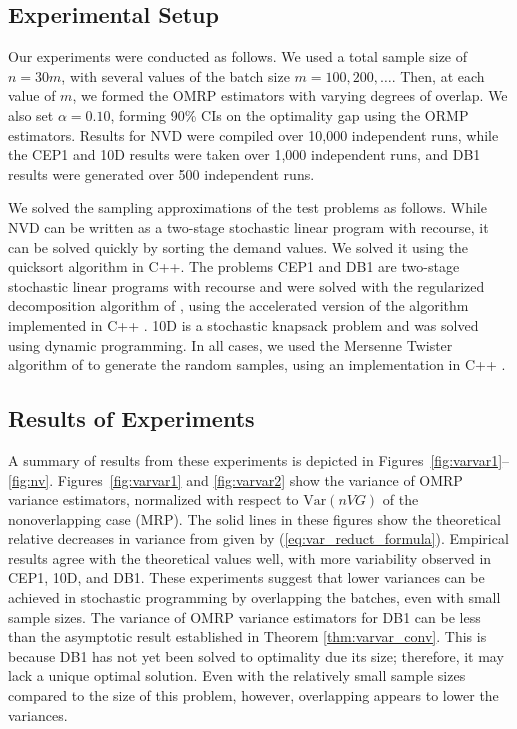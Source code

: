 \documentclass[12pt]{article}
\newcommand{\var}[1]{\mathrm{Var} \left( #1 \right)}
\begin{document}
\subsection{Experimental Setup}
\label{ssec:expS}


Our experiments were conducted as follows. 
We used a total sample size of $n = 30 m$, with several values of the batch size $m=100, 200, \ldots$. 
Then, at each value of $m$, we formed the OMRP estimators with varying degrees of overlap. 
We also set $\alpha=0.10$, forming 90\% CIs on the optimality gap using the ORMP estimators. 
Results for NVD were compiled over 10,000 independent runs, while the CEP1 and 10D results were taken over 1,000 independent runs, and DB1 results were generated over 500 independent runs.

We solved the sampling approximations of the test problems as follows.
While NVD can be written as a two-stage stochastic linear program with recourse, it can be solved quickly by sorting the demand values. 
We solved it using the quicksort algorithm in C++. 
The problems CEP1 and DB1 are two-stage stochastic linear programs with recourse and were solved with the regularized decomposition algorithm of \citet{ruszczynski1986regularized}, using the accelerated version of the algorithm implemented in C++ \citep{ruszczynski1997accelerating}. 
10D is a stochastic knapsack problem and was solved using dynamic programming.  
In all cases, we used the Mersenne Twister algorithm of \citet{matsumoto_nishimura_98} to generate the random samples, using an implementation in C++ \citep{wagner_twister_09}.




\subsection{Results of Experiments}
\label{ssec:results}

A summary of results from these experiments is depicted in Figures~\ref{fig:varvar1}--\ref{fig:nv}.
Figures~\ref{fig:varvar1} and \ref{fig:varvar2} show the variance of OMRP variance estimators, normalized with respect to $\var{nVG}$ of the nonoverlapping case (MRP). 
The solid lines in these figures show the theoretical relative decreases in variance from \citep{Welch1987} given by (\ref{eq:var_reduct_formula}). 
Empirical results agree with the theoretical values well, with more variability observed in CEP1, 10D, and DB1. 
These experiments suggest that lower variances can be achieved in stochastic programming by overlapping the batches, even with small sample sizes.
The variance of OMRP variance estimators for DB1 can be less than the asymptotic result established in Theorem \ref{thm:varvar_conv}.
This is because DB1 has not yet been solved to optimality due its size; therefore, it may lack a unique optimal solution. 
Even with the relatively small sample sizes compared to the size of this problem, however, overlapping appears to lower the variances. 
\end{document}

